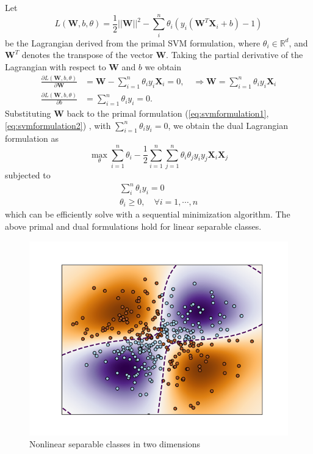 \documentclass[../Main/thesis.tex]{subfiles}
\begin{document}
Let 
\begin{equation}\label{eq:svmprime1}
L(\bm{W}, b, \theta) = \frac{1}{2}||  \bm{W}||^{2} -\sum_{i}^{n}\theta_{i}\left(y_{i}\left( \bm{W}^{T}\bm{X}_{i} + b \right) -1  \right)
\end{equation}
be the Lagrangian derived from the primal SVM formulation, where $\theta_{i} \in \mathbb{R}^{d}$, and $\bm{W}^{T}$ denotes the transpose of the vector $\bm{W}$. Taking the partial derivative of the Lagrangian with respect to $\bm{W}$ and $b$ we obtain  
\begin{equation}\label{eq:dual1}
\begin{split}
\frac{\partial L(\bm{W}, b, \theta)}{\partial \bm{W}} &= \bm{W}-\sum_{i=1}^{n}\theta_{i}y_{i}\bm{X}_{i} = 0, \quad \Rightarrow \bm{W} = \sum_{i=1}^{n}\theta_{i}y_{i}\bm{X}_{i}\\
\frac{\partial L(\bm{W}, b, \theta)}{\partial b} &= \sum_{i=1}^{n}\theta_{i}y_{i} = 0.
\end{split}
\end{equation}
Substituting $\bm{W}$ back to the primal formulation (\ref{eq:svmformulation1}, \ref{eq:svmformulation2}) , with $ \sum_{i=1}^{n}\theta_{i}y_{i} = 0$, we obtain the dual Lagrangian formulation as 
\begin{equation}
\max_{\theta}\sum_{i=1}^{n}\theta_{i} - \frac{1}{2}\sum_{i=1}^{n}\sum_{j=1}^{n}\theta_{i}\theta_{j}y_{i}y_{j}\bm{X}_{i}\bm{X}_{j}
\end{equation}
subjected to 
\begin{equation}
\begin{split}
\sum_{i}^{n}\theta_{i}y_{i} = 0\\
\theta_{i} \geq 0, \quad \forall i = 1,\cdots,n
\end{split}
\end{equation}
which can be efficiently solve with a sequential minimization algorithm. The above primal and dual formulations hold for linear separable classes. \begin{figure}[H] %
   \centering
   \includegraphics[width=5.4in]{../fig/nonlinearsvm.png} 
   \caption{Nonlinear separable classes in two dimensions}
   \label{fig:nonlinearsvm}
\end{figure}
\end{document}
